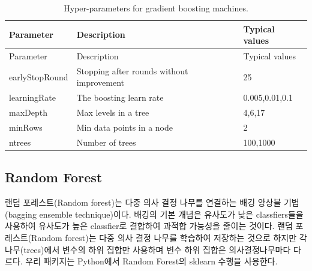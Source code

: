 \documentclass[11pt]{book}
\theoremstyle{definition}
\theoremstyle{definition}
\theoremstyle{definition}
\theoremstyle{remark}
\begin{document}
\begin{longtable}[]{@{}lll@{}}
\caption{\label{tab:gbmParameters} Hyper-parameters for gradient boosting
machines.}\tabularnewline
\toprule
Parameter & Description & Typical values\tabularnewline
\midrule
\endfirsthead
\toprule
Parameter & Description & Typical values\tabularnewline
\midrule
\endhead
earlyStopRound & Stopping after rounds without improvement &
25\tabularnewline
learningRate & The boosting learn rate & 0.005,0.01,0.1\tabularnewline
maxDepth & Max levels in a tree & 4,6,17\tabularnewline
minRows & Min data points in a node & 2\tabularnewline
ntrees & Number of trees & 100,1000\tabularnewline
\bottomrule
\end{longtable}

\subsection{Random Forest}\label{random-forest}

랜덤 포레스트(Random forest)는 다중 의사 결정 나무를 연결하는 배깅
앙상블 기법(bagging ensemble technique)이다. 배깅의 기본 개념은 유사도가
낮은 classfiers들을 사용하여 유사도가 높은 classfier로 결합하여 과적합
가능성을 줄이는 것이다. 랜덤 포레스트(Random forest)는 다중 의사 결정
나무를 학습하여 저장하는 것으로 하지만 각 나무(trees)에서 변수의 하위
집합만 사용하며 변수 하위 집합은 의사결정나무마다 다르다. 우리 패키지는
Python에서 Random Forest의 sklearn 수행을 사용한다.
  
\end{document}
